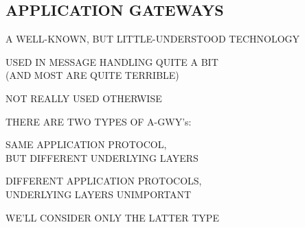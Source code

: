 \begin{bwslide}
\part*	{APPLICATION GATEWAYS}\bf

\begin{nrtc}
\item	A WELL-KNOWN, BUT LITTLE-UNDERSTOOD TECHNOLOGY
    \begin{nrtc}
    \item	USED IN MESSAGE HANDLING QUITE A BIT\\
		(AND MOST ARE QUITE TERRIBLE) 

    \item	NOT REALLY USED OTHERWISE    
    \end{nrtc}

\item	THERE ARE TWO TYPES OF A-GWY's:
    \begin{nrtc}
    \item	SAME APPLICATION PROTOCOL,\\
		BUT DIFFERENT UNDERLYING LAYERS

    \item	DIFFERENT APPLICATION PROTOCOLS,\\
		UNDERLYING LAYERS UNIMPORTANT
    \end{nrtc}

\item	WE'LL CONSIDER ONLY THE LATTER TYPE
\end{nrtc}
\end{bwslide}





